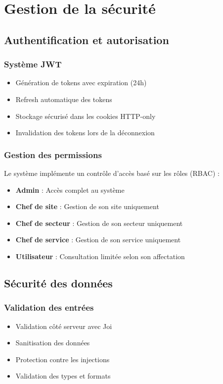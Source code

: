 \section{Gestion de la sécurité}
\subsection{Authentification et autorisation}
\subsubsection{Système JWT}
\begin{itemize}
    \item Génération de tokens avec expiration (24h)
    \item Refresh automatique des tokens
    \item Stockage sécurisé dans les cookies HTTP-only
    \item Invalidation des tokens lors de la déconnexion
\end{itemize}

\subsubsection{Gestion des permissions}
Le système implémente un contrôle d'accès basé sur les rôles (RBAC) :
\begin{itemize}
    \item \textbf{Admin} : Accès complet au système
    \item \textbf{Chef de site} : Gestion de son site uniquement
    \item \textbf{Chef de secteur} : Gestion de son secteur uniquement
    \item \textbf{Chef de service} : Gestion de son service uniquement
    \item \textbf{Utilisateur} : Consultation limitée selon son affectation
\end{itemize}

\subsection{Sécurité des données}
\subsubsection{Validation des entrées}
\begin{itemize}
    \item Validation côté serveur avec Joi
    \item Sanitisation des données
    \item Protection contre les injections
    \item Validation des types et formats
\end{itemize}

